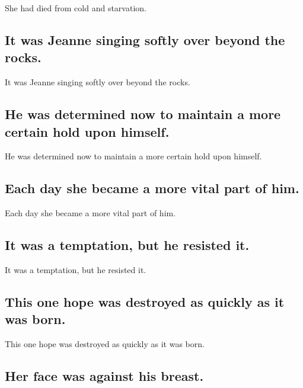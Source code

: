 \documentclass[]{article}
\begin{document}
She had died from cold and starvation.

\hypertarget{it-was-jeanne-singing-softly-over-beyond-the-rocks.}{%
\subsection{It was Jeanne singing softly over beyond the
rocks.}\label{it-was-jeanne-singing-softly-over-beyond-the-rocks.}}

It was Jeanne singing softly over beyond the rocks.

\hypertarget{he-was-determined-now-to-maintain-a-more-certain-hold-upon-himself.}{%
\subsection{He was determined now to maintain a more certain hold upon
himself.}\label{he-was-determined-now-to-maintain-a-more-certain-hold-upon-himself.}}

He was determined now to maintain a more certain hold upon himself.

\hypertarget{each-day-she-became-a-more-vital-part-of-him.}{%
\subsection{Each day she became a more vital part of
him.}\label{each-day-she-became-a-more-vital-part-of-him.}}

Each day she became a more vital part of him.

\hypertarget{it-was-a-temptation-but-he-resisted-it.}{%
\subsection{It was a temptation, but he resisted
it.}\label{it-was-a-temptation-but-he-resisted-it.}}

It was a temptation, but he resisted it.

\hypertarget{this-one-hope-was-destroyed-as-quickly-as-it-was-born.}{%
\subsection{This one hope was destroyed as quickly as it was
born.}\label{this-one-hope-was-destroyed-as-quickly-as-it-was-born.}}

This one hope was destroyed as quickly as it was born.

\hypertarget{her-face-was-against-his-breast.}{%
\subsection{Her face was against his
breast.}\label{her-face-was-against-his-breast.}}
\end{document}

